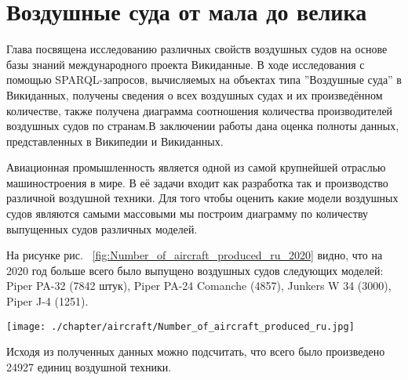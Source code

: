 \chapter{Воздушные суда от мала до велика}
\label{ch:aircraft-chapter}

Глава посвящена исследованию различных свойств воздушных судов на основе базы знаний международного проекта Викиданные. В ходе исследования с помощью SPARQL-запросов, вычисляемых на объектах типа ”Воздушные суда” в Викиданных, получены сведения о всех воздушных судах и их произведённом количестве, также получена диаграмма соотношения количества производителей воздушных судов по странам.В заключении работы дана оценка полноты данных, представленных в Википедии и Викиданных.

Авиационная промышленность является одной из самой крупнейшей отраслью машиностроения в мире. В её задачи входит как разработка так и производство различной воздушной техники. Для того чтобы оценить какие модели воздушных судов являются самыми массовыми мы построим диаграмму по количеству выпущенных судов различных моделей.

На рисунке рис. ~\ref{fig:Number_of_aircraft_produced_ru_2020} видно, что на 2020 год больше всего было выпущено воздушных судов следующих моделей: Piper PA-32 (7842 штук), Piper PA-24 Comanche (4857), Junkers W 34 (3000), Piper J-4 (1251).



\begin{figure*}[h!]
	\texttt{[image: ./chapter/aircraft/Number\_of\_aircraft\_produced\_ru.jpg]}
	\caption{Количество выпущенных воздушных судов по моделям, 2020.}
	\label{fig:Number_of_aircraft_produced_ru_2020}
\end{figure*}

Исходя из полученных данных можно подсчитать, что всего было произведено 24927 единиц воздушной техники.
